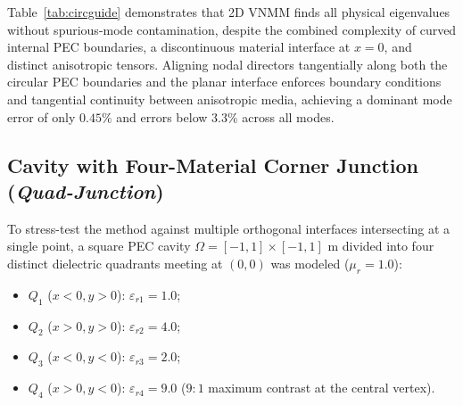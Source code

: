 \documentclass[11pt,a4paper]{article}
\begin{document}
\begin{table}[H]
\centering
\caption{Comparison of the first 5 eigenvalues in the bimaterial waveguide with PEC inclusions between 2D VNMM and reference FEM (340,363 edges).}
\label{tab:circguide}
\end{table}

Table~\ref{tab:circguide} demonstrates that 2D VNMM finds all physical eigenvalues without spurious-mode contamination, despite the combined complexity of curved internal PEC boundaries, a discontinuous material interface at $x = 0$, and distinct anisotropic tensors. Aligning nodal directors tangentially along both the circular PEC boundaries and the planar interface enforces boundary conditions and tangential continuity between anisotropic media, achieving a dominant mode error of only $\mathbf{0.45\%}$ and errors below $3.3\%$ across all modes.

\subsection{Cavity with Four-Material Corner Junction (\textit{Quad-Junction})}
To stress-test the method against multiple orthogonal interfaces intersecting at a single point, a square PEC cavity $\Omega = [-1, 1] \times [-1, 1]\text{ m}$ divided into four distinct dielectric quadrants meeting at $(0, 0)$ was modeled ($\mu_r = 1.0$):
\begin{itemize}
  \item $Q_1$ ($x < 0, y > 0$): $\varepsilon_{r1} = 1.0$;
  \item $Q_2$ ($x > 0, y > 0$): $\varepsilon_{r2} = 4.0$;
  \item $Q_3$ ($x < 0, y < 0$): $\varepsilon_{r3} = 2.0$;
  \item $Q_4$ ($x > 0, y < 0$): $\varepsilon_{r4} = 9.0$ ($9:1$ maximum contrast at the central vertex).
\end{itemize}
\end{document}
